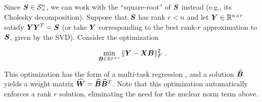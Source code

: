 Since $\bS \in \S_+^n$, we can work with the ``square-root'' of $\boldsymbol{S}$ instead (e.g., its
Cholesky decomposition). Suppose that $\boldsymbol{S}$ has rank $r<n$ and let $\boldsymbol{Y}\in {\mathbb R}^{n\times r}$
satisfy $\boldsymbol{Y}\boldsymbol{Y}^T = \boldsymbol{S}$ (or take $\boldsymbol{Y}$ corresponding to the best rank-$r$ approximation
to $\boldsymbol{S}$, given by the SVD). Consider the optimization

\begin{eqnarray}
\min_{\boldsymbol{B}\in {\mathbb R}^{p\times r}} \|\boldsymbol{Y}-\boldsymbol{X}\boldsymbol{B}\|_F^2 \ .
\end{eqnarray}

This optimization has the form of a multi-task regression \cite{obo11,lounici,vandegeer},
and a solution $\widehat {\boldsymbol{B}}$ yields a weight matrix $\widehat {\boldsymbol{W}} = \widehat {\boldsymbol{B}}
\widehat{\boldsymbol{B}}^{T}$. Note that this optimization automatically enforces a rank $r$ solution,
eliminating the need for the nuclear norm term above.



